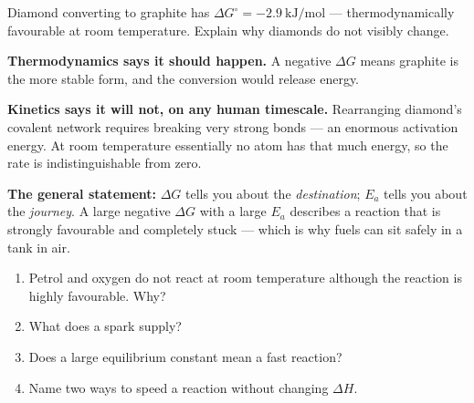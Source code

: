 \documentclass{apchem-worksheet}
\begin{document}
\begin{workedexample}
Diamond converting to graphite has
$\Delta G^\circ = \SI{-2.9}{\kilo\joule\per\mole}$ --- thermodynamically
favourable at room temperature. Explain why diamonds do not visibly
change.

\textbf{Thermodynamics says it should happen.} A negative $\Delta G$ means
graphite is the more stable form, and the conversion would release energy.

\textbf{Kinetics says it will not, on any human timescale.} Rearranging
diamond's covalent network requires breaking very strong  bonds ---
an enormous activation energy. At room temperature essentially no atom has
that much energy, so the rate is indistinguishable from zero.

\textbf{The general statement:} $\Delta G$ tells you about the
\emph{destination}; $E_a$ tells you about the \emph{journey}. A large
negative $\Delta G$ with a large $E_a$ describes a reaction that is
strongly favourable and completely stuck --- which is why fuels can sit
safely in a tank in air.
\end{workedexample}

\begin{yourturn}
\begin{enumerate}[leftmargin=*,itemsep=0.5em]
  \item Petrol and oxygen do not react at room temperature although the
        reaction is highly favourable. Why? \workspace[1.8cm]
  \item What does a spark supply? \workspace[1.4cm]
  \item Does a large equilibrium constant mean a fast reaction?
        \workspace[1.6cm]
  \item Name two ways to speed a reaction without changing $\Delta H$.
        \workspace[1.6cm]
\end{enumerate}
\end{yourturn}
\end{document}
